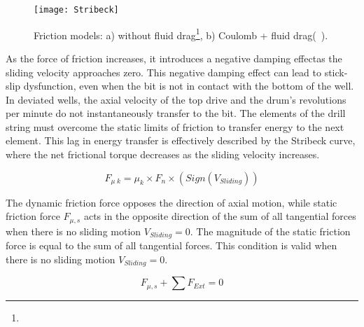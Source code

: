 \begin{figure}
  \centering
  \texttt{[image: Stribeck]}
  \caption[Comparison of friction models]{Friction models: a) without fluid drag\footnote{}, b) Coulomb + fluid drag\footnotemark[\value{footnote}] (~\cite{ref:cayeux2020a}). }
  \label{Friction models}
\end{figure}

As the force of friction increases, it introduces a negative damping effect\needsclarification[How so?]as the sliding velocity approaches zero. This negative damping effect can lead to stick-slip dysfunction, even when the bit is not in contact with the bottom of the well. In deviated wells, the axial velocity of the top drive and the drum's revolutions per minute do not instantaneously transfer to the bit. The elements of the drill string must overcome the static limits of friction to transfer energy to the next element. This lag in energy transfer is effectively described by the Stribeck curve, where the net frictional torque decreases as the sliding velocity increases.

\begin{equation}\label{dyanmic_force}
  F_{\mu\; k} = \mu_{k}\times F_{n} \times (Sign(V_{Sliding}))
\end{equation}

The dynamic friction force opposes the direction of axial motion, while static friction force $F_{\mu,s}$ acts in the opposite direction of the sum of all tangential forces when there is no sliding motion $V_{Sliding}=0$. The magnitude of the static friction force is equal to the sum of all tangential forces. This condition is valid when there is no sliding motion $V_{Sliding}=0$.

\begin{equation}\label{zero}
  F_{\mu,s} + \sum F_{Ext} = 0
\end{equation}

